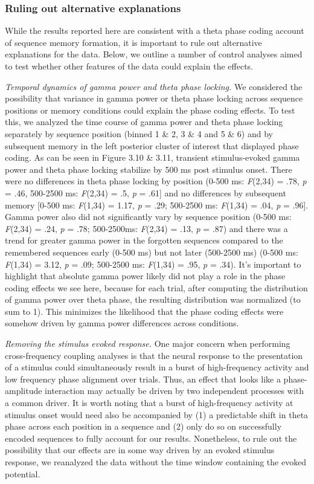 \subsubsection{Ruling out alternative
explanations}\label{ruling-out-alternative-explanations}

While the results reported here are consistent with a theta phase coding
account of sequence memory formation, it is important to rule out
alternative explanations for the data. Below, we outline a number of
control analyses aimed to test whether other features of the data could
explain the effects.

\emph{Temporal dynamics of gamma power and theta phase locking.} We
considered the possibility that variance in gamma power or theta phase
locking across sequence positions or memory conditions could explain the
phase coding effects. To test this, we analyzed the time course of gamma
power and theta phase locking separately by sequence position (binned 1
\& 2, 3 \& 4 and 5 \& 6) and by subsequent memory in the left posterior
cluster of interest that displayed phase coding. As can be seen in
Figure 3.10 \& 3.11, transient stimulus-evoked gamma power and theta
phase locking stabilize by 500 ms post stimulus onset. There were no
differences in theta phase locking by position (0-500 ms: \emph{F}(2,34)
= .78, \emph{p} = .46, 500-2500 ms: \emph{F}(2,34) = .5, \emph{p} =
.61{]} and no differences by subsequent memory {[}0-500 ms:
\emph{F}(1,34) = 1.17, \emph{p} = .29; 500-2500 ms: \emph{F}(1,34) =
.04, \emph{p} = .96{]}. Gamma power also did not significantly vary by
sequence position (0-500 ms: \emph{F}(2,34) = .24, \emph{p} = .78;
500-2500ms: \emph{F}(2,34) = .13, \emph{p} = .87) and there was a trend
for greater gamma power in the forgotten sequences compared to the
remembered sequences early (0-500 ms) but not later (500-2500 ms) (0-500
ms: \emph{F}(1,34) = 3.12, \emph{p} = .09; 500-2500 ms: \emph{F}(1,34) =
.95, \emph{p} = .34). It's important to highlight that absolute gamma
power likely did not play a role in the phase coding effects we see
here, because for each trial, after computing the distribution of gamma
power over theta phase, the resulting distribution was normalized (to
sum to 1). This minimizes the likelihood that the phase coding effects
were somehow driven by gamma power differences across conditions.

\emph{Removing the stimulus evoked response.} One major concern when
performing cross-frequency coupling analyses is that the neural response
to the presentation of a stimulus could simultaneously result in a burst
of high-frequency activity and low frequency phase alignment over
trials. Thus, an effect that looks like a phase-amplitude interaction
may actually be driven by two independent processes with a common
driver. It is worth noting that a burst of high-frequency activity at
stimulus onset would need also be accompanied by (1) a predictable shift
in theta phase across each position in a sequence and (2) only do so on
successfully encoded sequences to fully account for our results.
Nonetheless, to rule out the possibility that our effects are in some
way driven by an evoked stimulus response, we reanalyzed the data
without the time window containing the evoked potential.

